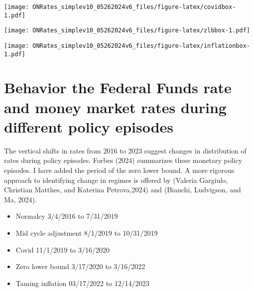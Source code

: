 \documentclass[
]{article}
\providecommand{\tightlist}{%
  \setlength{\itemsep}{0pt}\setlength{\parskip}{0pt}}
\let\origfigure\figure
\let\endorigfigure\endfigure
\renewenvironment{figure}[1][2] {
    \expandafter\origfigure\expandafter[H]
} {
    \endorigfigure
}
\begin{document}
\begin{figure}
\centering
\texttt{[image: ONRates\_simplev10\_05262024v6\_files/figure-latex/covidbox-1.pdf]}
\caption{\label{fig:covidbox}IQR and range of rates during covid period 11/1/2019-3/16/2020}
\end{figure}

\begin{figure}
\centering
\texttt{[image: ONRates\_simplev10\_05262024v6\_files/figure-latex/zlbbox-1.pdf]}
\caption{\label{fig:zlbbox}IQR and range of rates during zero lower bond period 3/17/2020-3/16/2022}
\end{figure}

\begin{figure}
\centering
\texttt{[image: ONRates\_simplev10\_05262024v6\_files/figure-latex/inflationbox-1.pdf]}
\caption{\label{fig:inflationbox}IQR and range of rates during inflation period 3/17/2022-12/14/2023}
\end{figure}

\hypertarget{behavior-the-federal-funds-rate-and-money-market-rates-during-different-policy-episodes}{%
\section{Behavior the Federal Funds rate and money market rates during different policy episodes}\label{behavior-the-federal-funds-rate-and-money-market-rates-during-different-policy-episodes}}

The vertical shifts in rates from 2016 to 2023 suggest changes in distribution of rates during policy episodes. Forbes (2024) summarizes these monetary policy episodes. I have added the period of the zero lower bound. A more rigorous approach to identifying change in regimes is offered by (Valeria Gargiulo, Christian Matthes, and Katerina Petrova,2024) and (Bianchi, Ludvigson, and Ma, 2024).

\begin{itemize}
\tightlist
\item
  Normalcy 3/4/2016 to 7/31/2019\\
\item
  Mid cycle adjustment 8/1/2019 to 10/31/2019\\
\item
  Covid 11/1/2019 to 3/16/2020\\
\item
  Zero lower bound 3/17/2020 to 3/16/2022\\
\item
  Taming inflation 03/17/2022 to 12/14/2023
\end{itemize}
\end{document}
